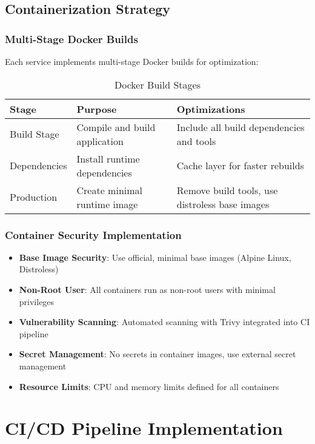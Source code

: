 \subsection{Containerization Strategy}

\subsubsection{Multi-Stage Docker Builds}

Each service implements multi-stage Docker builds for optimization:

\begin{table}[H]
\centering
\caption{Docker Build Stages}
\begin{tabular}{|p{2cm}|p{4cm}|p{6cm}|}
\hline
\textbf{Stage} & \textbf{Purpose} & \textbf{Optimizations} \\
\hline
Build Stage & Compile and build application & Include all build dependencies and tools \\
\hline
Dependencies & Install runtime dependencies & Cache layer for faster rebuilds \\
\hline
Production & Create minimal runtime image & Remove build tools, use distroless base images \\
\hline
\end{tabular}
\end{table}

\subsubsection{Container Security Implementation}

\begin{itemize}
    \item \textbf{Base Image Security}: Use official, minimal base images (Alpine Linux, Distroless)
    \item \textbf{Non-Root User}: All containers run as non-root users with minimal privileges
    \item \textbf{Vulnerability Scanning}: Automated scanning with Trivy integrated into CI pipeline
    \item \textbf{Secret Management}: No secrets in container images, use external secret management
    \item \textbf{Resource Limits}: CPU and memory limits defined for all containers
\end{itemize}

\section{CI/CD Pipeline Implementation}

